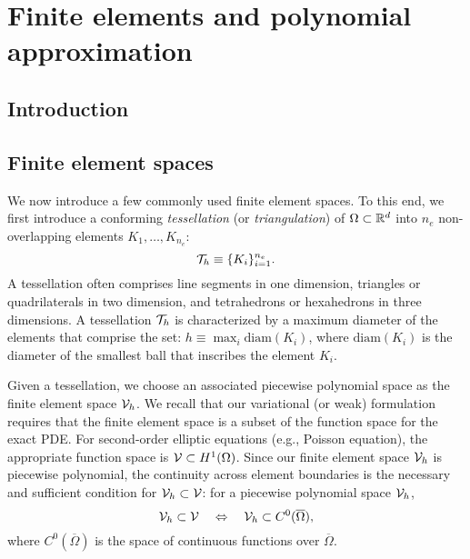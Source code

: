 \chapter{Finite elements and polynomial approximation}

\disclaimer

\section{Introduction}

\section{Finite element spaces}
We now introduce a few commonly used finite element spaces. To this end, we first introduce a conforming \emph{tessellation} (or \emph{triangulation}) of $\Omega \subset \mathbb{R}^d$ into $n_e$ non-overlapping elements $K_1, \dots, K_{n_e}$:
\begin{equation*}
  \mathcal{T}_h \equiv \{ K_i \}_{i=1}^{n_e}.
\end{equation*}
A tessellation often comprises line segments in one dimension, triangles or quadrilaterals in two dimension, and tetrahedrons or hexahedrons in three dimensions.  A tessellation $\mathcal{T}_h$ is characterized by a maximum diameter of the elements that comprise the set: $h \equiv \max_{i} \text{diam}(K_i)$, where $\text{diam}(K_i)$ is the diameter of the smallest ball that inscribes the element $K_i$.

Given a tessellation, we choose an associated piecewise polynomial space as the finite element space $\mathcal{V}_h$.  We recall that our variational (or weak) formulation requires that the finite element space is a subset of the function space for the exact PDE.  For second-order elliptic equations (e.g., Poisson equation), the appropriate function space is $\mathcal{V} \subset H^1(\Omega)$.  Since our finite element space $\mathcal{V}_h$ is piecewise polynomial, the continuity across element boundaries is the necessary and sufficient condition for $\mathcal{V}_h \subset \mathcal{V}$: for a piecewise polynomial space $\mathcal{V}_h$,
\begin{equation*}
  \mathcal{V}_h \subset \mathcal{V} \quad \Leftrightarrow \quad \mathcal{V}_h \subset C^0(\overline \Omega) ,
\end{equation*}
where  $C^0(\overline \Omega)$ is the space of continuous functions over $\overline \Omega$.

